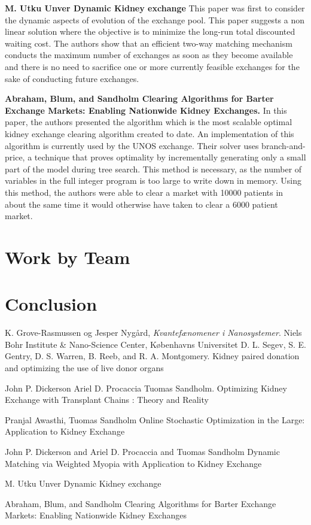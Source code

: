 \textbf{M. Utku Unver Dynamic Kidney exchange}\cite{vijay5}
This paper was first to consider the dynamic aspects of evolution of the exchange pool. This paper suggests a non linear solution where the objective is to minimize the long-run total discounted waiting cost. The authors show that an efficient two-way matching mechanism conducts the maximum number of exchanges as soon as they become available and there is no need to sacrifice one or more currently feasible exchanges for the sake of conducting future exchanges. 



\textbf{Abraham, Blum, and Sandholm  Clearing Algorithms for Barter Exchange Markets: Enabling Nationwide Kidney Exchanges.}\cite{vijay6}
In this paper, the authors presented the algorithm which is the most scalable optimal kidney exchange clearing algorithm created to date. An implementation of this algorithm is currently used by the UNOS exchange. Their solver uses branch-and-price, a technique that proves optimality by incrementally generating only a small part of the model during tree search. This method is necessary, as the number of variables in the full integer program is too large to write down in memory. Using this method, the authors were able to clear a market with 10000 patients in about the same time it would otherwise have taken to clear a 6000 patient market.

\newpage
\section{Work by Team }



\newpage
\section{Conclusion}

\begin{thebibliography}{10}
  K. Grove-Rasmussen og Jesper Nygård,
  \emph{Kvantefænomener i Nanosystemer}.
  Niels Bohr Institute \& Nano-Science Center, Københavns Universitet
D. L. Segev, S. E. Gentry, D. S. Warren, B. Reeb, and R. A. Montgomery. Kidney paired donation and optimizing the use of live donor organs

John P. Dickerson Ariel D. Procaccia Tuomas Sandholm. Optimizing Kidney Exchange with Transplant Chains : Theory and Reality


Pranjal Awasthi, Tuomas Sandholm Online Stochastic Optimization in the Large: Application to Kidney Exchange

John P. Dickerson and Ariel D. Procaccia and Tuomas Sandholm Dynamic Matching via Weighted Myopia with Application to Kidney Exchange

M. Utku Unver Dynamic Kidney exchange

Abraham, Blum, and Sandholm  Clearing Algorithms for Barter Exchange Markets: Enabling Nationwide Kidney Exchanges
\end{thebibliography}
